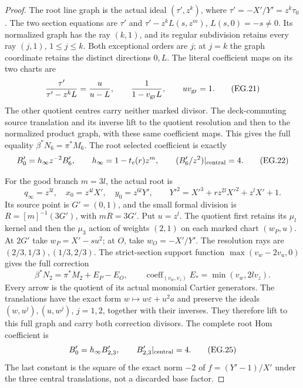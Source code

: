 \begin{proof}
The root line graph is the actual ideal \((\tau',z^k)\),
where \(\tau'=-X'/Y'=z^k\tau_0\). The two section equations
are \(\tau'\) and \(\tau'-z^kL(s,z^m)\), \(L(s,0)=-s\ne0\).
Its normalized graph has the ray \((k,1)\), and its regular
subdivision retains every ray \((j,1)\), \(1\le j\le k\).
Both exceptional orders are \(j\); at \(j=k\) the graph
coordinate retains the distinct directions \(0,L\). The
literal coefficient maps on its two charts are
\[
 \frac{\tau'}{\tau'-z^kL}=\frac{u}{u-L},\qquad
 \frac1{1-v_{\rm gr}L},\qquad uv_{\rm gr}=1 .
 \tag{EG.21}
\]
The other quotient centres carry neither marked divisor.
The deck-commuting source translation and its inverse lift
to the quotient resolution and then to the normalized
product graph, with these same coefficient maps. This
gives the full equality \(\beta^*N_6=\pi^*M_6\).
The root selected coefficient is exactly
\[
 B'_0=h_\infty z^{-2}B'_6,\qquad
 h_\infty=1-t_c(r)z^m,\qquad (B'_6/z^2)|_{\rm central}=4 .
 \tag{EG.22}
\]

For the good branch \(m=3l\), the actual root is
\[
 q_\infty=z^{3l},\quad x_0=z^{4l}X',\quad y_0=z^{6l}Y',
 \qquad
 Y'^2=X'^3+r z^{2l}X'^2+z^lX'+1 .
 \tag{EG.23}
\]
Its source point is \(G'=(0,1)\), and the small formal
division is \(R=[m]^{-1}(3G')\), with \(mR=3G'\).
Put \(u=z^l\). The quotient first retains its \(\mu_l\)
kernel and then the \(\mu_3\) action of weights \((2,1)\)
on each marked chart \((w_P,u)\). At \(2G'\) take
\(w_P=X'-su^2\); at \(O\), take \(w_O=-X'/Y'\).
The resolution rays are \((2/3,1/3),(1/3,2/3)\).
The strict-section support function
\(\max(v_w-2v_u,0)\) gives the full correction
\[
 \beta^*N_2=\pi^*M_2+E_P-E_O,\qquad
 \operatorname{coeff}_{(v_w,v_z)}E_*=\min(v_w,2l v_z).
 \tag{EG.24}
\]
Every arrow is the quotient of its actual monomial
Cartier generators. The translations have the exact
form \(w\mapsto w\varepsilon+u^2a\) and preserve the
ideals \((w,u^j),(u,w^j)\), \(j=1,2\), together with
their inverses. They therefore lift to this full graph
and carry both correction divisors. The complete root
Hom coefficient is
\[
 B'_0=h_\infty B'_{2,3},\qquad
 B'_{2,3}|_{\rm central}=4 .
 \tag{EG.25}
\]
The last constant is the square of the exact norm \(-2\)
of \(f=(Y'-1)/X'\) under the three central translations,
not a discarded base factor.


\end{proof}
